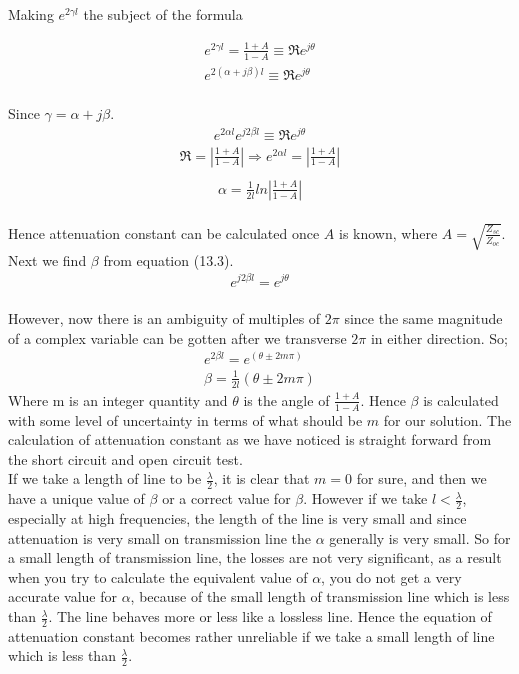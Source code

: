 \begin{center}
	Making $e^{2\gamma l}$ the subject of the formula
\end{center}
\begin{align*}
e^{2\gamma l} = \frac{1 +A}{1 - A}\equiv \Re e^{j\theta}\\
e^{2(\alpha + j\beta)l} \equiv \Re e^{j\theta}
\end{align*}
\\ Since $\gamma = \alpha + j\beta$.
\begin{align}
e^{2\alpha l}e^{j2\beta l} \equiv \Re e^{j\theta}
\end{align}
\begin{align*}
\Re = |\frac{1 + A}{1 - A}| \Rightarrow e^{2\alpha l} = |\frac{1 + A}{1 - A}|\\
\end{align*}
\begin{align}
\alpha = \frac{1}{2l}ln|\frac{1 + A}{1 - A}|
\end{align}
\\Hence attenuation constant can be calculated once $A$ is known, where $A = \sqrt{\frac{Z_{sc}}{Z_{oc}}}$. Next we find $\beta$ from equation (13.3).
\begin{align*}
e^{j2\beta l} = e^{j\theta}
\end{align*}\\
However, now there is an ambiguity of multiples of $2\pi$ since the same magnitude of a complex variable can be gotten after we transverse $2\pi$ in either direction. So;
\begin{align*}
 e^{2\beta l} = e^{(\theta \pm 2m\pi)}\\
 \beta = \frac{1}{2l} (\theta \pm 2m\pi)
\end{align*}
Where m is an integer quantity and $\theta$ is the angle of $\frac{1 + A}{1 - A}$. Hence $\beta$ is calculated with some level of uncertainty in terms of what should be $m$ for our solution. The calculation of attenuation constant as we have noticed is straight forward from the short circuit and open circuit test.\\

If we take a length of line to be $\frac{\lambda}{2}$, it is clear that $m = 0$ for sure, and then we have a unique value of $\beta$ or a correct value for $\beta$. However if we take $l < \frac{\lambda}{2}$, especially at high frequencies, the length of the line is very small and since attenuation is very small on transmission line the $\alpha$ generally is very small. So for a small length of transmission line, the losses are not very significant, as a result when you try to calculate the equivalent value of $\alpha$, you do not get a very accurate value for $\alpha$, because of the small length of transmission line which is less than $\frac{\lambda}{2}$. The line behaves more or less like a lossless line. Hence the equation of attenuation constant becomes rather unreliable if we take a small length of line which is less than $\frac{\lambda}{2}$.\\

